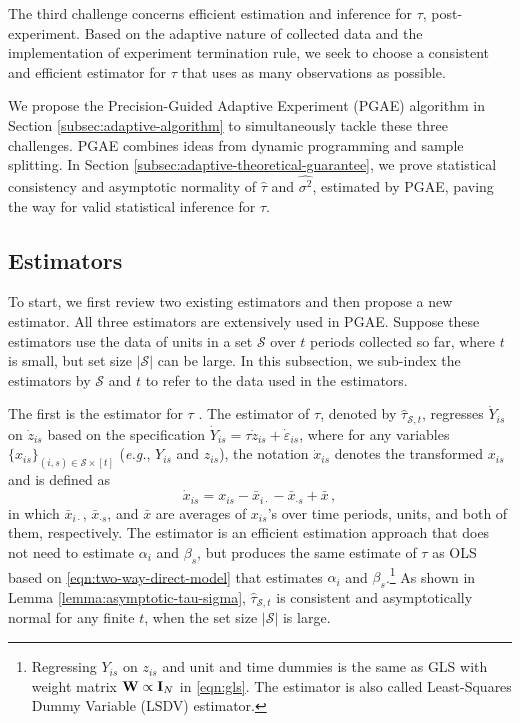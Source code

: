 The third challenge concerns efficient estimation and inference for $\tau$, post-experiment. Based on the adaptive nature of collected data and the implementation of experiment termination rule, we seek to choose a consistent and efficient estimator for $\tau$ that uses as many observations as possible.

We propose the Precision-Guided Adaptive Experiment (PGAE) algorithm in Section \ref{subsec:adaptive-algorithm} to simultaneously tackle these three challenges. PGAE combines ideas from dynamic programming and sample splitting. In Section \ref{subsec:adaptive-theoretical-guarantee},
we prove statistical consistency and asymptotic normality of $\hat\tau$ and $\widehat{\sigma^2}$, estimated by PGAE, paving the way for valid statistical inference for $\tau$. 

\subsection{Estimators}

To start, we first review two existing estimators and then propose a new estimator. All three estimators are extensively used in PGAE. 
Suppose these estimators use the data of units in a set $\mathcal{S}$ over $t$ periods collected so far, where $t$ is small, but set size $|\mathcal{S}|$ can be large. In this subsection, we sub-index the estimators by $\mathcal{S}$ and $t$ to refer to the data used in the estimators.

The first is the \within estimator for $\tau$ \citep{wallace1969use}. The \within estimator of $\tau$, denoted by $\hat{\tau}_{\mathcal{S},t}$, regresses $\dot{Y}_{is}$ on $\dot{z}_{is}$ based on the specification $\dot{Y}_{is} =  \tau \dot{z}_{is}  + \dot{\varepsilon}_{is}$, where for any variables $\{x_{is}\}_{(i,s) \in \mathcal{S} \times [t]}$ ({\it e.g.}, $Y_{is}$ and $z_{is}$), the notation $\dot{x}_{is}$ denotes the \within transformed $x_{is}$ and is defined as
\begin{equation}\label{eqn:within-estimator}
    \dot{x}_{is} = x_{is} - \bar{x}_{i \cdot} - \bar{x}_{\cdot s} + \bar{x}\,,
\end{equation}
in which $\bar{x}_{i \cdot}$, $\bar{x}_{\cdot s}$, and $ \bar{x}$ are averages of $x_{is}$'s over time periods, units, and both of them, respectively. The \within estimator is an efficient estimation approach that does not need to estimate $\alpha_i$ and $\beta_s$, but produces the same estimate of $\tau$ as OLS based on \eqref{eqn:two-way-direct-model} that estimates $\alpha_i$ and $\beta_s$.\footnote{Regressing  $Y_{is}$ on $z_{is}$ and unit and time dummies is the same as GLS with weight matrix $\mathbf{W} \propto \mathbf{I}_N$ in \eqref{eqn:gls}. The \within estimator is also called Least-Squares Dummy Variable (LSDV) estimator.
} As shown in Lemma \ref{lemma:asymptotic-tau-sigma}, $\hat{\tau}_{\mathcal{S},t}$ is consistent and asymptotically normal for any finite $t$, when the set size $|\mathcal{S}|$ is large.

